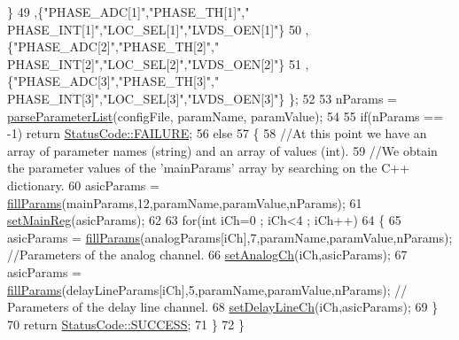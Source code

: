 \begin{DoxyCode}
      \}
49                                                                 ,\{\textcolor{stringliteral}{"PHASE\_ADC[1]"},\textcolor{stringliteral}{"PHASE\_TH[1]"},\textcolor{stringliteral}{"
      PHASE\_INT[1]"},\textcolor{stringliteral}{"LOC\_SEL[1]"},\textcolor{stringliteral}{"LVDS\_OEN[1]"}\}
50                                                                 ,\{\textcolor{stringliteral}{"PHASE\_ADC[2]"},\textcolor{stringliteral}{"PHASE\_TH[2]"},\textcolor{stringliteral}{"
      PHASE\_INT[2]"},\textcolor{stringliteral}{"LOC\_SEL[2]"},\textcolor{stringliteral}{"LVDS\_OEN[2]"}\}
51                                                                 ,\{\textcolor{stringliteral}{"PHASE\_ADC[3]"},\textcolor{stringliteral}{"PHASE\_TH[3]"},\textcolor{stringliteral}{"
      PHASE\_INT[3]"},\textcolor{stringliteral}{"LOC\_SEL[3]"},\textcolor{stringliteral}{"LVDS\_OEN[3]"}\}               \};
52 
53     nParams = \hyperlink{classICECALv3_a313e8166af1ce26b4026f883ad900fb9}{parseParameterList}(configFile, paramName, paramValue);
54 
55     \textcolor{keywordflow}{if}(nParams == -1) \textcolor{keywordflow}{return} \hyperlink{classStatusCode_a6f565cbeadc76d14c72f047e5e85eb4ba3da73d4c469762eb9d3c960368252b26}{StatusCode::FAILURE};
56     \textcolor{keywordflow}{else}
57     \{
58         \textcolor{comment}{//At this point we have an array of parameter names (string) and an array of values (int).}
59         \textcolor{comment}{//We obtain the parameter values of the 'mainParams' array by searching on the C++ dictionary.}
60         asicParams = \hyperlink{classICECALv3_ac006abc42a048308427f6801d783a407}{fillParams}(mainParams,12,paramName,paramValue,nParams);
61         \hyperlink{classICECALv3_a479f7e17669da4b785af840049d39cb4}{setMainReg}(asicParams);
62 
63         \textcolor{keywordflow}{for}(\textcolor{keywordtype}{int} iCh=0 ; iCh<4 ; iCh++)
64         \{
65             asicParams = \hyperlink{classICECALv3_ac006abc42a048308427f6801d783a407}{fillParams}(analogParams[iCh],7,paramName,paramValue,nParams);            \textcolor{comment}{
      //Parameters of the analog channel.}
66             \hyperlink{classICECALv3_a9578e4d13c250d8bc417f68c79d6a21d}{setAnalogCh}(iCh,asicParams);
67             asicParams = \hyperlink{classICECALv3_ac006abc42a048308427f6801d783a407}{fillParams}(delayLineParams[iCh],5,paramName,paramValue,nParams);     \textcolor{comment}{//
      Parameters of the delay line channel.}
68             \hyperlink{classICECALv3_a14a7a29c9a3412c062f053cc616b860a}{setDelayLineCh}(iCh,asicParams);       
69         \}
70         \textcolor{keywordflow}{return} \hyperlink{classStatusCode_a6f565cbeadc76d14c72f047e5e85eb4badd0da38d3ba0d922efd1f4619bc37ad8}{StatusCode::SUCCESS};
71     \}
72 \}
\end{DoxyCode}
\mbox{\label{classObject_a58b2d0618c2d08cf2383012611528d97}} 
